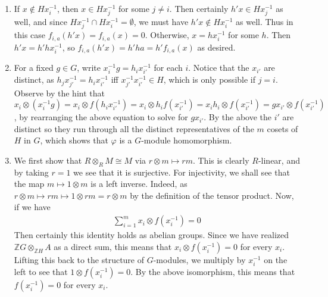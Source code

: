 \documentclass[12pt]{article}
\theoremstyle{definitionstyle}
\def\mbb#1{\mathbb{#1}}
\def\cph{\varphi}
\newcommand{\Z}{\mbb Z}
\begin{document}
\begin{enumerate}
\begin{enumerate}
            \item If $x \not \in Hx_i^{-1}$, then $x \in Hx_j^{-1}$ for some $j \neq i$. Then certainly $h'x \in Hx_j^{-1}$ as well, and since $Hx_j^{-1} \cap Hx_i^{-1} = \emptyset$, we must have $h'x \not \in Hx_i^{-1}$ as well. Thus in this case $f_{i,a}(h'x) = f_{i,a}(x) = 0$. Otherwise, $x = hx_i^{-1}$ for some $h$. Then $h'x = h'hx_i^{-1}$, so $f_{i,a}(h'x) = h'ha = h'f_{i,a}(x)$ as desired.
            
            \item For a fixed $g \in G$, write $x_i^{-1}g = h_ix_{i'}^{-1}$ for each $i$. Notice that the $x_{i'}$ are distinct, as $h_jx_{j'}^{-1} = h_ix_{i'}^{-1}$ iff $x_{j'}^{-1}x_{i'}^{-1} \in H$, which is only possible if $j = i$. Observe by the hint that $x_i \otimes (x_i^{-1}g) = x_i \otimes f(h_ix_{i'}^{-1}) = x_i \otimes h_if(x_{i'}^{-1}) = x_ih_i \otimes f(x_{i'}^{-1}) = gx_{i'} \otimes f(x_{i'}^{-1})$, by rearranging the above equation to solve for  $gx_{i'}$. By the above the $i'$ are distinct so they run through all the distinct representatives of the $m$ cosets of $H$ in $G$, which shows that $\cph$ is a $G$-module homomorphism.
            
            \item We first show that $R \otimes_R M \cong M$ via $r \otimes m \mapsto rm$. This is clearly $R$-linear, and by taking $r = 1$ we see that it is surjective. For injectivity, we shall see that the map $m \mapsto 1 \otimes m$ is a left inverse. Indeed, as $r \otimes m \mapsto rm \mapsto 1 \otimes rm = r \otimes m$ by the definition of the tensor product. Now, if we have
            \begin{align*}
                \sum_{i=1}^m x_i \otimes f(x_i^{-1}) = 0
            \end{align*}
            Then certainly this identity holds as abelian groups. Since we have realized $\Z G \otimes_{\Z H} A$ as a direct sum, this means that $x_i \otimes f(x_i^{-1}) = 0$ for every $x_i$. Lifting this back to the structure of $G$-modules, we multiply by $x_i^{-1}$ on the left to see that $1 \otimes f(x_i^{-1}) = 0$. By the above isomorphism, this means that $f(x_i^{-1}) = 0$ for every $x_i$.


\end{enumerate}
\end{enumerate}
\end{document}

